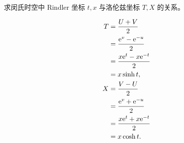 \begin{xiti}
	\item 求闵氏时空中 Rindler 坐标 $t,x$ 与洛伦兹坐标 $T,X$ 的关系。

	\begin{jie}
		\begin{align*}
			T &= \frac{U+V}{2}\\
			&= \frac{\mathrm{e}^{v} - \mathrm{e}^{-u}}{2}\\
			&= \frac{x \mathrm{e}^{t} - x \mathrm{e}^{-t}}{2}\\
			&= x \sinh{t},\\
			X &= \frac{V - U}{2}\\
			&= \frac{\mathrm{e}^{v} + \mathrm{e}^{-u}}{2}\\
			&= \frac{x \mathrm{e}^{t} + x\mathrm{e}^{-t}}{2}\\
			&= x \cosh{t}.
		\end{align*}
	\end{jie}
\end{xiti}
